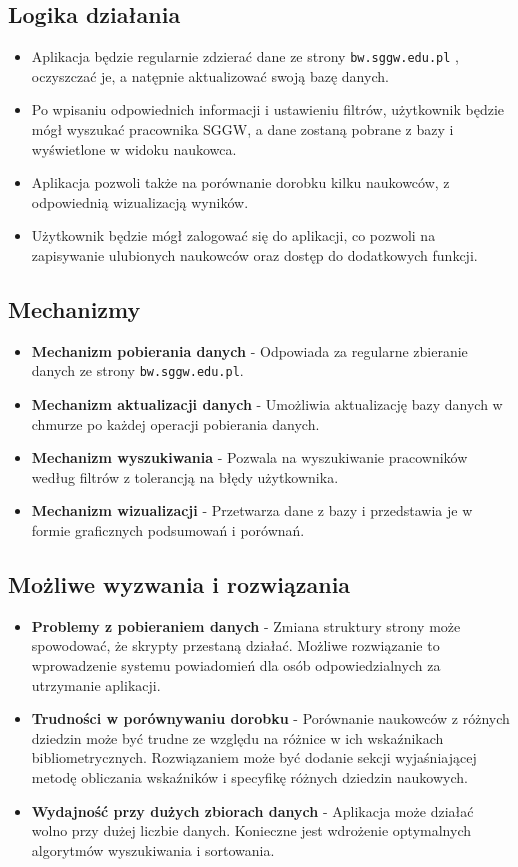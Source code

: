 \documentclass{article}
\begin{document}
\subsection{Logika działania}
\begin{itemize}
  \item Aplikacja będzie regularnie zdzierać dane ze strony \texttt{bw.sggw.edu.pl} , oczyszczać je, a natępnie aktualizować swoją bazę danych.
  \item Po wpisaniu odpowiednich informacji i ustawieniu filtrów, użytkownik będzie mógł wyszukać pracownika SGGW, a dane zostaną pobrane z bazy i wyświetlone w widoku naukowca.
  \item Aplikacja pozwoli także na porównanie dorobku kilku naukowców, z odpowiednią wizualizacją wyników.
  \item Użytkownik będzie mógł zalogować się do aplikacji, co pozwoli na zapisywanie ulubionych naukowców oraz dostęp do dodatkowych funkcji.
\end{itemize}

\subsection{Mechanizmy}
\begin{itemize}
  \item \textbf{Mechanizm pobierania danych} - Odpowiada za regularne zbieranie danych ze strony \texttt{bw.sggw.edu.pl}.
  \item \textbf{Mechanizm aktualizacji danych} - Umożliwia aktualizację bazy danych w chmurze po każdej operacji pobierania danych.
  \item \textbf{Mechanizm wyszukiwania} - Pozwala na wyszukiwanie pracowników według filtrów z tolerancją na błędy użytkownika.
  \item \textbf{Mechanizm wizualizacji} - Przetwarza dane z bazy i przedstawia je w formie graficznych podsumowań i porównań.
\end{itemize}

\subsection{Możliwe wyzwania i rozwiązania}
\begin{itemize}
  \item \textbf{Problemy z pobieraniem danych} - Zmiana struktury strony może spowodować, że skrypty przestaną działać. Możliwe rozwiązanie to wprowadzenie systemu powiadomień dla osób odpowiedzialnych za utrzymanie aplikacji.
  \item \textbf{Trudności w porównywaniu dorobku} - Porównanie naukowców z różnych dziedzin może być trudne ze względu na różnice w ich wskaźnikach bibliometrycznych. Rozwiązaniem może być dodanie sekcji wyjaśniającej metodę obliczania wskaźników i specyfikę różnych dziedzin naukowych.
  \item \textbf{Wydajność przy dużych zbiorach danych} - Aplikacja może działać wolno przy dużej liczbie danych. Konieczne jest wdrożenie optymalnych algorytmów wyszukiwania i sortowania.
\end{itemize}
\end{document}
